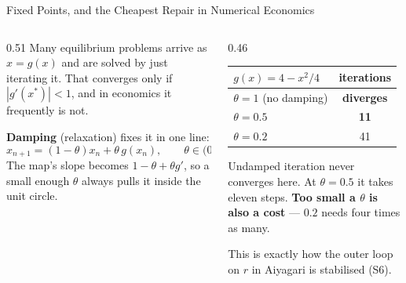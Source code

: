 \begin{frame}{Fixed Points, and the Cheapest Repair in Numerical Economics}
\begin{columns}[T]
\begin{column}{0.51\textwidth}
\small
Many equilibrium problems arrive as $x=g(x)$ and are solved by just iterating it. That converges only if $|g'(x^{*})|<1$, and in economics it frequently is not.
\medskip

\textbf{Damping} (relaxation) fixes it in one line:
\[
  x_{n+1}=(1-\theta)x_n+\theta\, g(x_n), \qquad \theta\in(0,1].
\]
The map's slope becomes $1-\theta+\theta g'$, so a small enough $\theta$ always pulls it inside the unit circle.
\end{column}
\begin{column}{0.46\textwidth}
\begin{center}\footnotesize
\begin{tabularx}{\linewidth}{@{}>{\raggedright\arraybackslash}X c@{}}
\toprule
$g(x)=4-x^{2}/4$ & \textbf{iterations} \\
\midrule
$\theta=1$ (no damping) & \textbf{diverges} \\
$\theta=0.5$ & \textbf{11} \\
$\theta=0.2$ & 41 \\
\bottomrule
\end{tabularx}
\end{center}
\vspace{1mm}
\begin{takeawaybox}\footnotesize
Undamped iteration never converges here. At $\theta=0.5$ it takes eleven steps. \textbf{Too small a $\theta$ is also a cost} --- $0.2$ needs four times as many.
\end{takeawaybox}
\medskip
\begin{examplebox}\footnotesize
This is exactly how the outer loop on $r$ in Aiyagari is stabilised (S6).
\end{examplebox}
\end{column}
\end{columns}
\end{frame}

